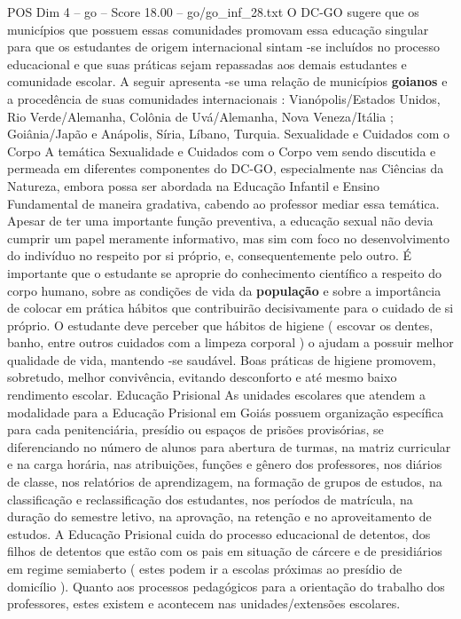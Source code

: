 \begin{textsample}{POS Dim 4 – go – Score 18.00 – go/go\_inf\_28.txt}
O DC-GO sugere que os municípios que possuem essas comunidades promovam essa educação singular para que os estudantes de origem internacional sintam -se incluídos no processo educacional e que suas práticas sejam repassadas aos demais estudantes e comunidade escolar.
A seguir apresenta -se uma relação de municípios \textbf{goianos} e a procedência de suas comunidades internacionais : Vianópolis/Estados Unidos, Rio Verde/Alemanha, Colônia de Uvá/Alemanha, Nova Veneza/Itália ; Goiânia/Japão e Anápolis, Síria, Líbano, Turquia.
Sexualidade e Cuidados com o Corpo A temática Sexualidade e Cuidados com o Corpo vem sendo discutida e permeada em diferentes componentes do DC-GO, especialmente nas Ciências da Natureza, embora possa ser abordada na Educação Infantil e Ensino Fundamental de maneira gradativa, cabendo ao professor mediar essa temática.
Apesar de ter uma importante função preventiva, a educação sexual não devia cumprir um papel meramente informativo, mas sim com foco no desenvolvimento do indivíduo no respeito por si próprio, e, consequentemente pelo outro.
É importante que o estudante se aproprie do conhecimento científico a respeito do corpo humano, sobre as condições de vida da \textbf{população} e sobre a importância de colocar em prática hábitos que contribuirão decisivamente para o cuidado de si próprio.
O estudante deve perceber que hábitos de higiene ( escovar os dentes, banho, entre outros cuidados com a limpeza corporal ) o ajudam a possuir melhor qualidade de vida, mantendo -se saudável.
Boas práticas de higiene promovem, sobretudo, melhor convivência, evitando desconforto e até mesmo baixo rendimento escolar.
Educação Prisional As unidades escolares que atendem a modalidade para a Educação Prisional em Goiás possuem organização específica para cada penitenciária, presídio ou espaços de prisões provisórias, se diferenciando no número de alunos para abertura de turmas, na matriz curricular e na carga horária, nas atribuições, funções e gênero dos professores, nos diários de classe, nos relatórios de aprendizagem, na formação de grupos de estudos, na classificação e reclassificação dos estudantes, nos períodos de matrícula, na duração do semestre letivo, na aprovação, na retenção e no aproveitamento de estudos.
A Educação Prisional cuida do processo educacional de detentos, dos filhos de detentos que estão com os pais em situação de cárcere e de presidiários em regime semiaberto ( estes podem ir a escolas próximas ao presídio de domicílio ).
Quanto aos processos pedagógicos para a orientação do trabalho dos professores, estes existem e acontecem nas unidades/extensões escolares.

\end{textsample}
